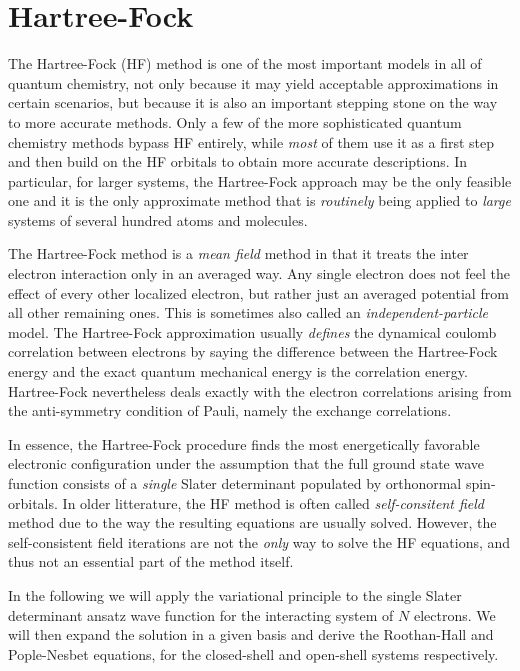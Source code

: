 \documentclass[a4paper]{article}
\title{}
\date{}
\author{}
\newcommand{\R}{\mathbb{R}}
\newcommand{\comment}[1]{\ignorespaces}
\begin{document}
\renewcommand{\R}{{\bf R}}
\renewcommand{\r}{{\bf r}}
\newcommand{\x}{{\bf x}}
\newcommand{\psiz}{|\Psi_0\rangle}


\section{Hartree-Fock}
The Hartree-Fock (HF) method is one of the most important models in all of quantum chemistry, not only because it may yield acceptable approximations in certain scenarios, but because it is also an important stepping stone on the way to more accurate methods. Only a few of the more sophisticated quantum chemistry methods bypass HF entirely, while \emph{most} of them use it as a first step and then build on the HF orbitals to obtain more accurate descriptions\cite{szabo}\comment{p108}. In particular, for larger systems, the Hartree-Fock approach may be the only feasible one and it is the only approximate method that is \emph{routinely} being applied to \emph{large} systems of several hundred atoms and molecules\cite{helgaker}\comment{p433}.

The Hartree-Fock method is a \emph{mean field} method in that it treats the inter electron interaction only in an averaged way\cite{kvaal}\comment{p44}. Any single electron does not feel the effect of every other localized electron, but rather just an averaged potential from all other remaining ones. This is sometimes also called an \emph{independent-particle} model. The Hartree-Fock approximation usually \emph{defines} the dynamical coulomb correlation between electrons by saying the difference between the Hartree-Fock energy and the exact quantum mechanical energy is the correlation energy. Hartree-Fock nevertheless deals exactly with the electron correlations arising from the anti-symmetry condition of Pauli, namely the exchange correlations. 

In essence, the Hartree-Fock procedure finds the most energetically favorable electronic configuration under the assumption that the full ground state wave function consists of a \emph{single} Slater determinant populated by orthonormal spin-orbitals. In older litterature, the HF method is often called \emph{self-consitent field} method due to the way the resulting equations are usually solved\cite{levine}\comment{p292}. However, the self-consistent field iterations are not the \emph{only} way to solve the HF equations, and thus not an essential part of the method itself\cite{helgaker}\comment{433}.

In the following we will apply the variational principle to the single Slater determinant ansatz wave function for the interacting system of $N$ electrons. We will then expand the solution in a given basis and derive the Roothan-Hall and Pople-Nesbet equations, for the closed-shell and open-shell systems respectively. 
\end{document}
